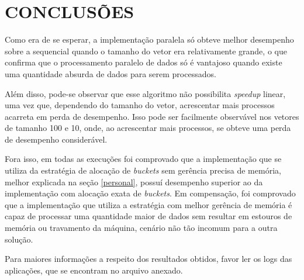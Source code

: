 \section{\normalsize CONCLUSÕES}
	Como era de se esperar, a implementação paralela só obteve melhor desempenho sobre a sequencial quando o tamanho do vetor era relativamente grande, o que confirma que o processamento paralelo de dados só é vantajoso quando existe uma quantidade absurda de dados para serem processados. 
	
	Além disso, pode-se observar que esse algoritmo não possibilita \textit{speedup} linear, uma vez que, dependendo do tamanho do vetor, acrescentar mais processos acarreta em perda de desempenho. Isso pode ser facilmente observável nos vetores de tamanho 100 e 10, onde, ao acrescentar mais processos, se obteve uma perda de desempenho considerável.
	
	Fora isso, em todas as execuções foi comprovado que a implementação que se utiliza da estratégia de alocação de \textit{buckets} sem gerência precisa de memória, melhor explicada na seção \ref{personal}, possuí desempenho superior ao da implementação com alocação exata de \textit{buckets}. Em compensação, foi comprovado que a implementação que utiliza a estratégia com melhor gerência de memória é capaz de processar uma quantidade maior de dados sem resultar em estouros de memória ou travamento da máquina, cenário não tão incomum para a outra solução.
	
	Para maiores informações a respeito dos resultados obtidos, favor ler os logs das aplicações, que se encontram no arquivo anexado.